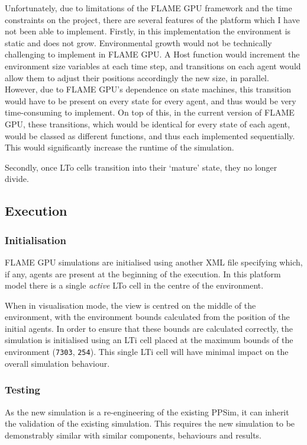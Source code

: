 \documentclass{UoYCSproject}
\begin{document}
Unfortunately, due to limitations of the \gls{FLAME GPU} framework and the time constraints on the project, there are several features of the \gls{platform} which I have not been able to implement.
Firstly, in this implementation the environment is static and does not grow.
Environmental growth would not be technically challenging to implement in \gls{FLAME GPU}.
A \gls{Host} function would increment the environment size variables at each time step, and transitions on each agent would allow them to adjust their positions accordingly the new size, in parallel.
However, due to \gls{FLAME GPU}'s dependence on state machines, this transition would have to be present on every state for every agent, and thus would be very time-consuming to implement.
On top of this, in the current version of \gls{FLAME GPU}, these transitions, which would be identical for every state of each agent, would be classed as different functions, and thus each implemented sequentially.
This would significantly increase the runtime of the simulation.

Secondly, once \gls{LTo} cells transition into their `mature' state, they no longer divide.

\subsection{Execution}
\subsubsection{Initialisation}
\gls{FLAME GPU} simulations are initialised using another XML file specifying which, if any, agents are present at the beginning of the execution.
In this platform model there is a single \textit{active} \gls{LTo} cell in the centre of the environment.

When in visualisation mode, the view is centred on the middle of the environment, with the environment bounds calculated from the position of the initial agents.
In order to ensure that these bounds are calculated correctly, the simulation is initialised using an \gls{LTi} cell placed at the maximum bounds of the environment (\texttt{7303}, \texttt{254}).
This single \gls{LTi} cell will have minimal impact on the overall simulation behaviour.

\subsubsection{Testing}
As the new simulation is a re-engineering of the existing PPSim, it can inherit the validation of the existing simulation.
This requires the new simulation to be demonstrably similar with similar components, behaviours and results.
\end{document}
